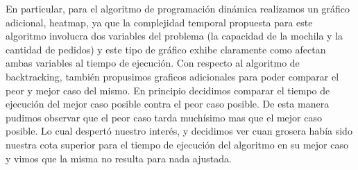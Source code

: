 En particular, para el algoritmo de programación dinámica realizamos un gráfico adicional, heatmap, ya que la complejidad temporal propuesta para este algoritmo involucra dos variables del problema (la capacidad de la mochila y la cantidad de pedidos) y este tipo de gráfico exhibe claramente como afectan ambas variables al tiempo de ejecución.
Con respecto al algoritmo de backtracking, también propusimos graficos adicionales para poder comparar el peor y mejor caso del mismo.
En principio decidimos comparar el tiempo de ejecución del mejor caso posible contra el peor caso posible. De esta manera pudimos observar que el peor caso tarda muchísimo mas que el mejor caso posible. Lo cual despertó nuestro interés, y decidimos ver cuan grosera había sido nuestra cota superior para el tiempo de ejecución del algoritmo en su mejor caso y vimos que la misma no resulta para nada ajustada.